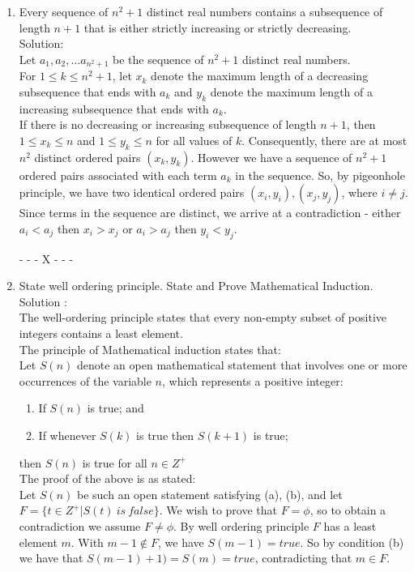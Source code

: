 \documentclass{article}
\begin{document}
\begin{enumerate}
    \item Every sequence of $n^2 + 1$ distinct real numbers contains a subsequence of length $n + 1$ that is either strictly increasing or strictly decreasing.\\
    
    Solution: \\
    
Let $a_1, a_2, \dots a_{n^2+1}$ be the sequence of $n^2+1$ distinct real numbers. \\
For $1 \leq k \leq n^2+1$, let $x_k$ denote the maximum length of  a decreasing subsequence that ends with $a_k$ and $y_k$ denote the maximum length of  a increasing subsequence that ends with $a_k$.\\ 
	If there is no decreasing or increasing subsequence of length $n+1$, then $1 \leq x_k \leq n$ and $1 \leq y_k \leq n$ for all values of $k$.  Consequently, there are at most $n^2$ distinct ordered pairs $(x_k,y_k)$. However we have a sequence of $n^2 +1$ ordered pairs associated with each term $a_k$ in the sequence. So, by pigeonhole principle, we have two identical ordered pairs $(x_i,y_i) , (x_j,y_j)$, where $i\neq j$. Since terms in the sequence are distinct, we arrive at a contradiction - either $a_i < a_j$ then $x_i > x_j$ or  $a_i > a_j$ then $y_i < y_j$.  	

\begin{center}
- - - X - - -
\end{center}
    
    \item State well ordering principle. State and Prove Mathematical Induction.\\
    Solution : \\
    The well-ordering principle states that every non-empty subset of positive integers contains a least element. \\

The principle of Mathematical induction states that:\\
Let $S(n)$ denote an open mathematical statement that involves one or more occurrences of the variable $n$, which represents a positive integer:
\begin{enumerate}
\item If $S(n)$ is true; and
\item If whenever $S(k)$ is true then $S(k+1)$ is true;
\end{enumerate}
then $S(n)$ is true for all $n \in Z^+$ \\

The proof of the above is as stated:\\
Let $S(n)$ be such an open statement satisfying (a), (b), and let $F=\{ t \in Z^+|S(t)\ is \ false \}$. 
We wish to prove that $F= \phi$, so to obtain a contradiction we assume $F \neq \phi$. By well ordering principle $F$ has a least element $m$. With $m-1 \notin F$, we have $S(m-1) = true$. So by condition (b) we have that $S(m-1)+1) = S(m) = true$, contradicting that $m \in F$. 



\end{enumerate}
\end{document}
